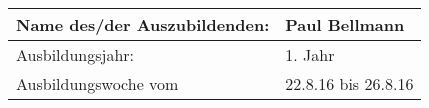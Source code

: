 
	\begin{center}
		\begin{tabular}{ | m{15em} | m{21em} | }
		\hline
		Name des/der Auszubildenden: & Paul Bellmann \\ \hline
		Ausbildungsjahr: & 1. Jahr \\ \hline
		Ausbildungswoche vom & 22.8.16 bis 26.8.16 \\ \hline
		\end{tabular}
	\end{center}